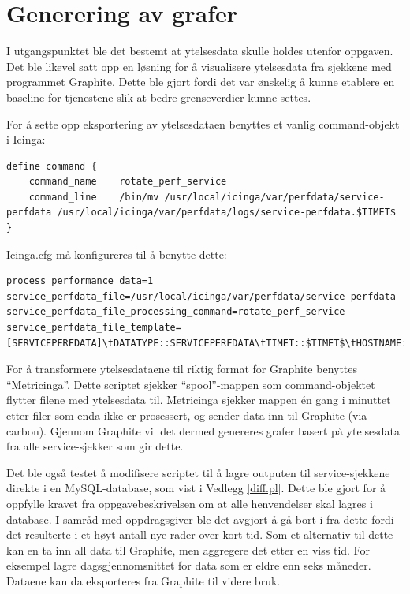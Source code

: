 \section{Generering av grafer}
I utgangspunktet ble det bestemt at ytelsesdata skulle holdes utenfor oppgaven. Det ble likevel satt opp en løsning for å visualisere ytelsesdata fra sjekkene med programmet Graphite\cite{graphite}. Dette ble gjort fordi det var ønskelig å kunne etablere en baseline for tjenestene slik at bedre grenseverdier kunne settes.

For å sette opp eksportering av ytelsesdataen benyttes et vanlig command-objekt i Icinga:
\begin{lstlisting}[style=example]
define command {
    command_name	rotate_perf_service
    command_line	/bin/mv /usr/local/icinga/var/perfdata/service-perfdata /usr/local/icinga/var/perfdata/logs/service-perfdata.$TIMET$
}
\end{lstlisting}

Icinga.cfg må konfigureres til å benytte dette:
\begin{lstlisting}[style=example]
process_performance_data=1
service_perfdata_file=/usr/local/icinga/var/perfdata/service-perfdata
service_perfdata_file_processing_command=rotate_perf_service
service_perfdata_file_template=[SERVICEPERFDATA]\tDATATYPE::SERVICEPERFDATA\tTIMET::$TIMET$\tHOSTNAME::$HOSTNAME$\tSERVICEDESC::$SERVICEDESC$\tSERVICEPERFDATA::$SERVICEPERFDATA$service_perfdata_file_processing_interval=200
\end{lstlisting}

For å transformere ytelsesdataene til riktig format for Graphite benyttes ``Metricinga''\cite{metricinga}. Dette scriptet sjekker ``spool''-mappen som command-objektet flytter filene med ytelsesdata til. Metricinga sjekker mappen én gang i minuttet etter filer som enda ikke er prosessert, og sender data inn til Graphite (via carbon). Gjennom Graphite vil det dermed genereres grafer basert på ytelsesdata fra alle service-sjekker som gir dette.

Det ble også testet å modifisere scriptet til å lagre outputen til service-sjekkene direkte i en MySQL-database, som vist i Vedlegg \ref{diff.pl}. Dette ble gjort for å oppfylle kravet fra oppgavebeskrivelsen om at alle henvendelser skal lagres i database. I samråd med oppdragsgiver ble det avgjort å gå bort i fra dette fordi det resulterte i et høyt antall nye rader over kort tid. Som et alternativ til dette kan en ta inn all data til Graphite, men aggregere det etter en viss tid. For eksempel lagre dagsgjennomsnittet for data som er eldre enn seks måneder. Dataene kan da eksporteres fra Graphite til videre bruk.


